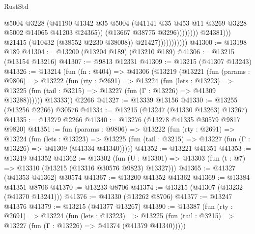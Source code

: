 \begin{lexlean}{RustStd}
\begin{coremodule}
                                              @5004
                                              @3228
                                              (@41190
                                                @1342
                                                @35
                                                @5004
                                                (@41141
                                                  @35
                                                  @453
                                                  @11
                                                  @3269
                                                  @3228
                                                  @5002
                                                  @14065
                                                  @41203
                                                  @24365))
                                              (@13667 @38775 @3296))))))))
                                @24381)))
                          @21415
                          (@10432 (@38552 @2230 @38008))
                          @21427)))))))))))
@41300 := @13198 @189
@41304 := @13200 (@13204 @189) (@13210 @189)
@41306 := @13215 (@13154 @13216)
@41307 := @9813 @12331
@41309 := @13215 (@41307 @13243)
@41326 := @13214
    (fun (fn : @404) =>
    @41306
      (@13219
        (@13221
          (fun (params : @9806) =>
          @13222
            (fun (rty : @2691) =>
            @13224
              (fun (lets : @13223) =>
              @13225 (fun (tail : @3215) => @13227 (fun (Γ : @13226) => @41309 @13288))))))
        @13333))
    @2266
@41327 := @13339 @13156
@41330 := @13255 (@13256 @2266) @30576
@41334 := @13215 (@13247 (@41330 @13263) @13267)
@41335 := @13279 @2266
@41340 := @13276 (@13278 @41335 @30579 @9817 @9820)
@41351 := fun (params : @9806) =>
  @13222
    (fun (rty : @2691) =>
    @13224
      (fun (lets : @13223) =>
      @13225 (fun (tail : @3215) => @13227 (fun (Γ : @13226) => @41309 (@41334 @41340)))))
@41352 := @13221 @41351
@41353 := @13219 @41352
@41362 := @13302
    (fun (U : @13301) => @13303 (fun (t : @7) => @13310 (@13215 (@13316 @30576 @9823) @13327)))
@41365 := @41327 (@41353 @41362) @30574
@41367 := @13200 @41352 @41362
@41369 := @13384 @41351 @8706
@41370 := @13233 @8706
@41374 := @13215 (@41307 (@13232 (@41370 @13241)))
@41376 := @41330 (@13262 @8706)
@41377 := @13247 @41376
@41379 := @13215 (@41377 @13267)
@41390 := @13387
    (fun (rty : @2691) =>
    @13224
      (fun (lets : @13223) =>
      @13225 (fun (tail : @3215) => @13227 (fun (Γ : @13226) => @41374 (@41379 @41340)))))

\end{coremodule}
\end{lexlean}
